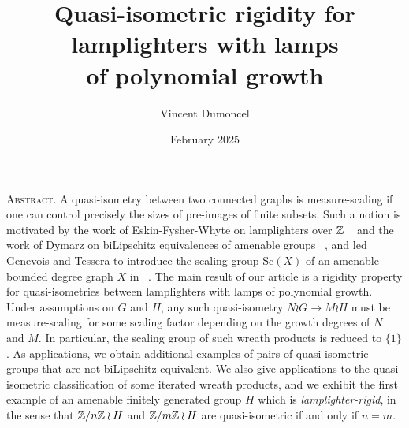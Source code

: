 \documentclass[11pt,letterpaper]{amsart}
\theoremstyle{plain}
\theoremstyle{definition}
\numberwithin{equation}{section}
\begin{document}
\begin{titlepage}
\setcounter{page}{1}
\title[Quasi-isometric rigidity for lamplighters with lamps of polynomial growth]{Quasi-isometric rigidity for lamplighters with lamps \\ of polynomial growth}
\author{\small{Vincent Dumoncel}}
\address{Institut de Mathématiques de Jussieu-Paris Rive Gauche \\ \texttt{vincent.dumoncel@imj-prg.fr}}


\date{February 2025}
\maketitle

\textsc{Abstract.} A quasi-isometry between two connected graphs is measure-scaling if one can control precisely the sizes of pre-images of finite subsets. Such a notion is motivated by the work of Eskin-Fysher-Whyte on lamplighters over $\mathbb{Z}$ ~\cite{EFW12, EFW13} and the work of Dymarz on biLipschitz equivalences of amenable groups ~\cite{Dym05, Dym10}, and led Genevois and Tessera to introduce the scaling group $\text{Sc}(X)$ of an amenable bounded degree graph $X$ in ~\cite{GT22}. The main result of our article is a rigidity property for quasi-isometries between lamplighters with lamps of polynomial growth. Under assumptions on $G$ and $H$, any such quasi-isometry $N\wr G\longrightarrow M\wr H$ must be measure-scaling for some scaling factor depending on the growth degrees of $N$ and $M$. In particular, the scaling group of such wreath products is reduced to $\lbrace 1\rbrace$. As applications, we obtain additional examples of pairs of quasi-isometric groups that are not biLipschitz equivalent. We also give applications to the quasi-isometric classification of some iterated wreath products, and we exhibit the first example of an amenable finitely generated group $H$ which is \textit{lamplighter-rigid}, in the sense that $\mathbb{Z}/n\mathbb{Z}\wr H$ and $\mathbb{Z}/m\mathbb{Z}\wr H$ are quasi-isometric if and only if $n=m$.


\begin{spacing}{1.3}
\tableofcontents 
\end{spacing}













\begin{spacing}{1.3}
\printbibliography
\end{spacing}




\end{titlepage}
\end{document}
